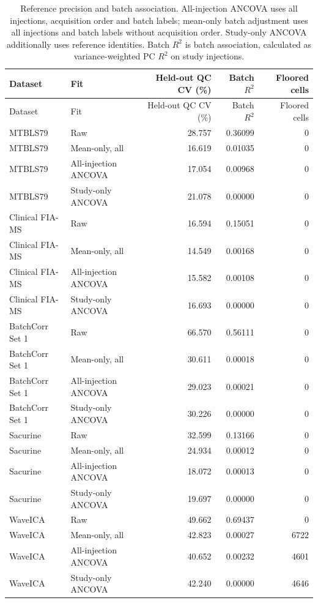 \scriptsize
\begin{longtable}{llrrr}
\caption{Reference precision and batch association. All-injection ANCOVA uses all injections, acquisition order and batch labels; mean-only batch adjustment uses all injections and batch labels without acquisition order. Study-only ANCOVA additionally uses reference identities. Batch $R^2$ is batch association, calculated as variance-weighted PC $R^2$ on study injections.}\label{tab:supp_nearest_baselines}\\
\toprule
Dataset & Fit & Held-out QC CV (\%) & Batch $R^2$ & Floored cells \\
\midrule
\endfirsthead
\toprule
Dataset & Fit & Held-out QC CV (\%) & Batch $R^2$ & Floored cells \\
\midrule
\endhead
\bottomrule
\endlastfoot
MTBLS79 & Raw & 28.757 & 0.36099 & 0 \\
MTBLS79 & Mean-only, all & 16.619 & 0.01035 & 0 \\
MTBLS79 & All-injection ANCOVA & 17.054 & 0.00968 & 0 \\
MTBLS79 & Study-only ANCOVA & 21.078 & 0.00000 & 0 \\
Clinical FIA-MS & Raw & 16.594 & 0.15051 & 0 \\
Clinical FIA-MS & Mean-only, all & 14.549 & 0.00168 & 0 \\
Clinical FIA-MS & All-injection ANCOVA & 15.582 & 0.00108 & 0 \\
Clinical FIA-MS & Study-only ANCOVA & 16.693 & 0.00000 & 0 \\
BatchCorr Set 1 & Raw & 66.570 & 0.56111 & 0 \\
BatchCorr Set 1 & Mean-only, all & 30.611 & 0.00018 & 0 \\
BatchCorr Set 1 & All-injection ANCOVA & 29.023 & 0.00021 & 0 \\
BatchCorr Set 1 & Study-only ANCOVA & 30.226 & 0.00000 & 0 \\
Sacurine & Raw & 32.599 & 0.13166 & 0 \\
Sacurine & Mean-only, all & 24.934 & 0.00012 & 0 \\
Sacurine & All-injection ANCOVA & 18.072 & 0.00013 & 0 \\
Sacurine & Study-only ANCOVA & 19.697 & 0.00000 & 0 \\
WaveICA & Raw & 49.662 & 0.69437 & 0 \\
WaveICA & Mean-only, all & 42.823 & 0.00027 & 6722 \\
WaveICA & All-injection ANCOVA & 40.652 & 0.00232 & 4601 \\
WaveICA & Study-only ANCOVA & 42.240 & 0.00000 & 4646 \\
\end{longtable}
